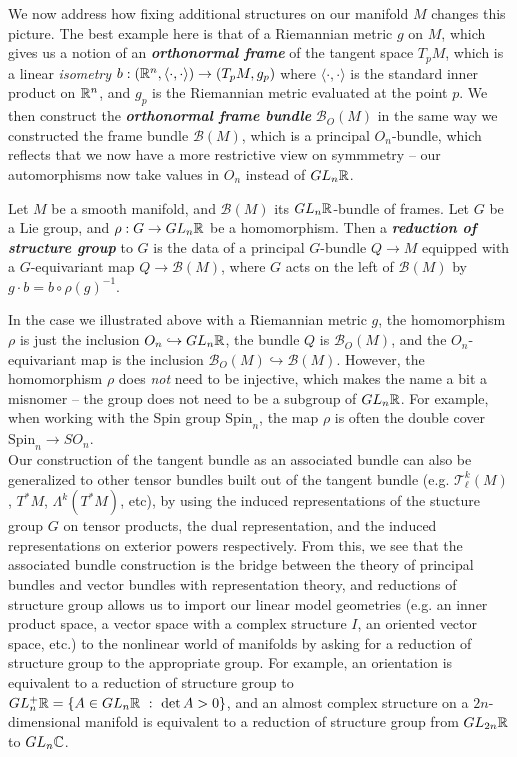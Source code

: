\documentclass[abstract=on,twoside]{scrreprt}
\begin{document}
We now address how fixing additional structures on our manifold $M$ changes this
picture. The best example here is that of a Riemannian metric $g$ on $M$, which gives
us a notion of an \textbf{\textit{orthonormal frame}} of the tangent space $T_pM$,
which is a linear \emph{isometry} $b : (\mathbb{R}^n,\langle\cdot,\cdot\rangle) \to (T_pM,g_p)$
where $\langle\cdot,\cdot\rangle$ is the standard inner product on $\mathbb{R}^n$, and
$g_p$ is the Riemannian metric evaluated at the point $p$. We then construct the
\textbf{\textit{orthonormal frame bundle}} $\mathcal{B}_O(M)$ in the same way we
constructed the frame bundle $\mathcal{B}(M)$, which is a principal $O_n$-bundle,
which reflects that we now have a more restrictive view on symmmetry -- our
automorphisms now take values in $O_n$ instead of $GL_n\mathbb{R}$.
%
\begin{definition}
Let $M$ be a smooth manifold, and $\mathcal{B}(M)$ its $GL_n\mathbb{R}$-bundle of frames.
Let $G$ be a Lie group, and $\rho : G \to GL_n\mathbb{R}$ be a homomorphism. Then a
\textbf{\textit{reduction of structure group}} to $G$ is the data of a principal
$G$-bundle $Q \to M$ equipped with a $G$-equivariant map $Q \to \mathcal{B}(M)$, where
$G$ acts on the left of $\mathcal{B}(M)$ by $g \cdot b = b \circ \rho(g)^{-1}$.
\end{definition}
%
In the case we illustrated above with a Riemannian metric $g$, the homomorphism
$\rho$ is just the inclusion $O_n \hookrightarrow GL_n\mathbb{R}$, the bundle $Q$ is
$\mathcal{B}_O(M)$, and the $O_n$-equivariant map is the inclusion
$\mathcal{B}_O(M) \hookrightarrow \mathcal{B}(M)$. However, the homomorphism $\rho$
does \emph{not} need to be injective, which makes the name a bit a misnomer -- the
group does not need to be a subgroup of $GL_n\mathbb{R}$. For example, when working with
the Spin group $\mathrm{Spin}_n$, the map $\rho$ is often the double cover
$\mathrm{Spin}_n \to SO_n$. \\

Our construction of the tangent bundle as an associated bundle can also be generalized
to other tensor bundles built out of the tangent bundle (e.g. $\mathcal{T}^k_\ell(M)$,
$T^*M$, $\Lambda^k(T^*M)$, etc), by using the induced representations of the
stucture group $G$ on tensor products, the dual representation, and the induced
representations on exterior powers respectively. From this, we see that the associated
bundle construction is the bridge between the theory of principal bundles and vector
bundles with representation theory, and reductions of structure group allows us to
import our linear model geometries (e.g. an inner product space, a vector space with
a complex structure $I$, an oriented vector space, etc.) to the nonlinear world of
manifolds by asking for a reduction of structure group to the appropriate group. For
example, an orientation is equivalent to a reduction of structure group to
$GL_n^+\mathbb{R} = \{A \in GL_n\mathbb{R} ~:~ \det A > 0\}$, and an almost complex structure on a
$2n$-dimensional manifold is equivalent  to a reduction of structure group from
$GL_{2n}\mathbb{R}$ to $GL_n\mathbb{C}$.
%
\end{document}
